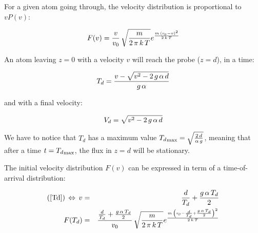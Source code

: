 \documentclass[a4,english,11pt]{article}
\begin{document}
For a given atom going through, the velocity distribution is
proportional to $v P(v)$:

\begin{equation}\label{F_Velocity}
    F(v) = \frac{v}{v_0}\, \sqrt {{\frac {m}{2\, \pi\, k\, T }}}{e^{{\frac {m\, \left( {\it v_0}-v \right) ^{2}}{2\,k\,T}}}}
\end{equation}

An atom leaving $z=0$ with a velocity $v$ will reach the probe
($z=d$), in a time:

\begin{equation}\label{Td}
    T_d = {\frac {v-\sqrt {{v}^{2}-2\,g\,{\it \alpha}\,d}}{g\,{\it \alpha}}}
\end{equation}

and with a final velocity:

\begin{equation}
    V_d = \sqrt {{v}^{2}-2\,g\,{\it \alpha}\,d}
\end{equation}

We have to notice that $T_d$ has a maximum value ${T_d}_{\rm max} =
\sqrt{\frac{2\,d}{\alpha\,g}}$, meaning that after a time $t =
{T_d}_{\rm max}$, the flux in $z = d$ will be stationary.

The initial velocity distribution $F(v)$ can be expressed in term of
a time-of-arrival distribution:

\begin{eqnarray}\label{F_Td}
  (\ref{Td})\, \Leftrightarrow\, v &=& \frac{d}{T_d} + \frac{g\,\alpha\,T_d}{2} \\
  F(T_d) &=& \frac{\frac{d}{T_d} + \frac{g\,\alpha\,T_d}{2}}{v_0}\, \sqrt {{\frac {m}{2\, \pi\, k\, T }}}{e^{{\frac {m\, \left( {\it v_0}-\frac{d}{T_d} + \frac{g\,\alpha\,T_d}{2} \right) ^{2}}{2\,k\,T}}}}
\end{eqnarray}
\end{document}
